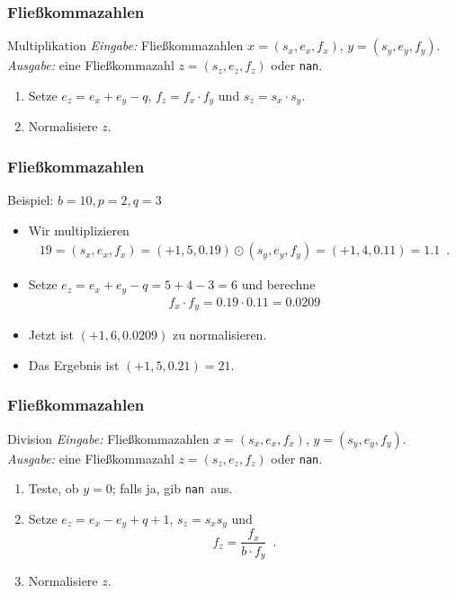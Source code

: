 \documentclass{beamer}
\newcommand\nan{{\tt nan}}
\newcommand{\mytitle}{Flie\ss kommazahlen}
\begin{document}
\begin{frame}\frametitle{\mytitle}
	\begin{block}{Multiplikation}
		{\em Eingabe:} Flie\ss kommazahlen $x=(s_x,e_x,f_x)$, $y=(s_y,e_y,f_y)$.\\
		{\em Ausgabe:} eine Flie\ss kommazahl $z=(s_z,e_z,f_z)$ oder \nan.
		\begin{enumerate}
			\item Setze $e_z= e_x+e_y-q$, $f_z=  f_x\cdot f_y$ und $s_z= s_x\cdot s_y$.
			\item Normalisiere $z$.
		\end{enumerate}
	\end{block}
\end{frame}

\begin{frame}\frametitle{\mytitle}
	\begin{block}{Beispiel: $b=10,p=2,q=3$}
		\begin{itemize}
			\item Wir multiplizieren
				\begin{align*}
					19=(s_x,e_x,f_x)=(+1,5,0.19)\odot(s_y,e_y,f_y)=(+1,4,0.11)=1.1\enspace.
				\end{align*}
			\item Setze $e_z=e_x+e_y-q=5+4-3=6$ und berechne
				\begin{align*}
					f_x\cdot f_y=0.19\cdot0.11=0.0209
				\end{align*}
			\item Jetzt ist $(+1,6,0.0209)$ zu normalisieren.
			\item Das Ergebnis ist $(+1,5,0.21)=21$.
		\end{itemize}
	\end{block}
\end{frame}

\begin{frame}\frametitle{\mytitle}
	\begin{block}{Division}
		{\em Eingabe:} Flie\ss kommazahlen $x=(s_x,e_x,f_x)$, $y=(s_y,e_y,f_y)$.\\
		{\em Ausgabe:} eine Flie\ss kommazahl $z=(s_z,e_z,f_z)$ oder \nan.
		\begin{enumerate}
			\item Teste, ob $y=0$; falls ja, gib \nan\ aus.
			\item Setze $e_z= e_x-e_y+q+1$, $s_z= s_xs_y$ und $$f_z= \frac{f_x}{b\cdot f_y}\enspace.$$ 
			\item Normalisiere $z$.
		\end{enumerate}
	\end{block}
\end{frame}
\end{document}

